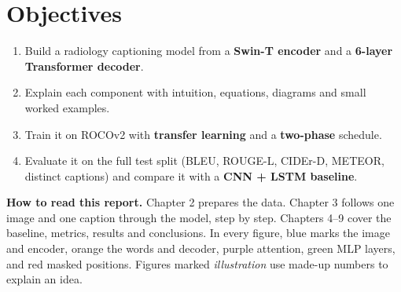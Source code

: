 \section{Objectives}

\begin{enumerate}
\def\labelenumi{\arabic{enumi}.}
\tightlist
\item
  Build a radiology captioning model from a \textbf{Swin-T encoder} and a \textbf{6-layer Transformer decoder}.
\item
  Explain each component with intuition, equations, diagrams and small worked examples.
\item
  Train it on ROCOv2 with \textbf{transfer learning} and a \textbf{two-phase} schedule.
\item
  Evaluate it on the full test split (BLEU, ROUGE-L, CIDEr-D, METEOR, distinct captions) and compare it with a \textbf{CNN + LSTM baseline}.
\end{enumerate}

\textbf{How to read this report.} Chapter 2 prepares the data. Chapter 3 follows one image and one caption through the model, step by step. Chapters 4--9 cover the baseline, metrics, results and conclusions. In every figure, blue marks the image and encoder, orange the words and decoder, purple attention, green MLP layers, and red masked positions. Figures marked \emph{illustration} use made-up numbers to explain an idea.
